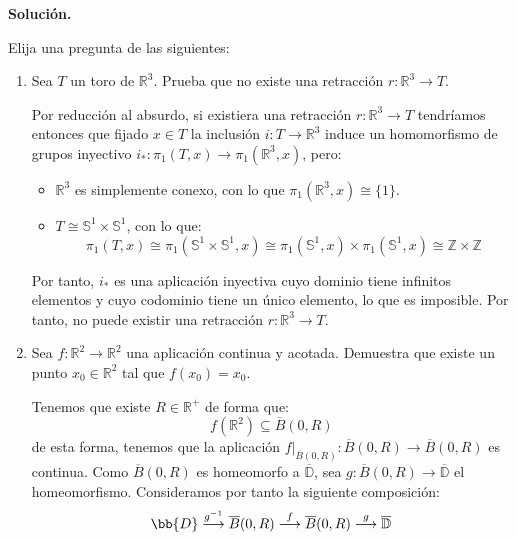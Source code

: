 \documentclass[12pt]{article}
\begin{document}
    \newpage
    \setcounter{ejercicio}{0} %
    \noindent
    \textbf{Solución.}

    \begin{ejercicio}[5 puntos]
        Elija una pregunta de las siguientes:
        \begin{enumerate}[label=\alph*)]
            \item Sea $T$ un toro de $\mathbb{R}^3$. Prueba que no existe una retracción $r:\mathbb{R}^3\to T$.

                Por reducción al absurdo, si existiera una retracción $r:\mathbb{R}^3\to T$ tendríamos entonces que fijado $x\in T$ la inclusión $i:T\to \mathbb{R}^3$ induce un homomorfismo de grupos inyectivo $i_\ast:\pi_1(T,x)\to \pi_1(\mathbb{R}^3,x)$, pero:
                \begin{itemize}
                    \item $\mathbb{R}^3$ es simplemente conexo, con lo que $\pi_1(\mathbb{R}^3,x) \cong \{1\}$.
                    \item $T\cong \mathbb{S}^1\times \mathbb{S}^1$, con lo que:
                    \begin{equation*}
                        \pi_1(T,x) \cong \pi_1(\mathbb{S}^1\times \mathbb{S}^1,x) \cong \pi_1(\mathbb{S}^1,x)\times \pi_1(\mathbb{S}^1,x) \cong \mathbb{Z}\times \mathbb{Z}
                    \end{equation*}
                \end{itemize}

                Por tanto, $i_\ast$ es una aplicación inyectiva cuyo dominio tiene infinitos elementos y cuyo codominio tiene un único elemento, lo que es imposible. Por tanto, no puede existir una retracción $r:\mathbb{R}^3\to T$.
            \item Sea $f:\mathbb{R}^2\to \mathbb{R}^2$ una aplicación continua y acotada. Demuestra que existe un punto $x_0\in \mathbb{R}^2$ tal que $f(x_0) = x_0$.

                Tenemos que existe $R\in \mathbb{R}^+$ de forma que:
                \begin{equation*}
                    f(\mathbb{R}^2)\subseteq \overline{B}(0,R)
                \end{equation*}
                de esta forma, tenemos que la aplicación ${f}\Big|_{\overline{B}(0,R)}:\overline{B}(0,R)\to \overline{B}(0,R)$ es continua. Como $\overline{B}(0,R)$ es homeomorfo a $\overline{\mathbb{D}}$, sea $g:\overline{B}(0,R)\to \overline{\mathbb{D}}$ el homeomorfismo. Consideramos por tanto la siguiente composición:
                \begin{equation*}
                    \bb{D} \stackrel{g^{-1}}{\longrightarrow} \overline{B}(0,R) \stackrel{{f}}{\longrightarrow} \overline{B}(0,R) \stackrel{g}{\longrightarrow} \overline{\mathbb{D}}
                \end{equation*}


\end{enumerate}
\end{ejercicio}
\end{document}
